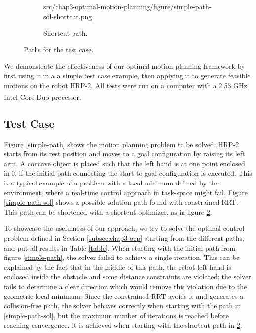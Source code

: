 \begin{figure}
\begin{subfigure}{0.32\columnwidth}
                    {src/chap3-optimal-motion-planning/figure/simple-path-sol-shortcut.png}
    \caption{Shortcut path.}
    \label{simple-path-sol-shortcut}
  \end{subfigure}
  \caption{Paths for the test case.}
\end{figure}

We demonstrate the effectiveness of our optimal motion planning
framework by first using it in a a simple test case example, then
applying it to generate feasible motions on the robot HRP-2. All tests
were run on a computer with a 2.53 GHz
Intel\textsuperscript{\textregistered} Core Duo
processor.

\subsection{Test Case}
\label{test-case}
Figure \ref{simple-path} shows the motion planning problem to be
solved: HRP-2 starts from its rest position and moves to a goal
configuration by raising its left arm. A concave object is placed such
that the left hand is at one point enclosed in it if the initial path
connecting the start to goal configuration is executed. This is a
typical example of a problem with a local minimum defined by the
environment, where a real-time control approach in task-space might
fail. Figure \ref{simple-path-sol} shows a possible solution path
found with constrained RRT. This path can be shortened with a shortcut
optimizer, as in figure \ref{simple-path-sol-shortcut}.

To showcase the usefulness of our approach, we try to solve the
optimal control problem defined in Section \ref{subsec:chap3-ocp}
starting from the different paths, and put all results in Table
\ref{table}. When starting with the initial path from figure
\ref{simple-path}, the solver failed to achieve a single
iteration. This can be explained by the fact that in the middle of
this path, the robot left hand is enclosed inside the obstacle and
some distance constraints are violated; the solver fails to determine
a clear direction which would remove this violation due to the
geometric local minimum. Since the constrained RRT avoids it and
generates a collision-free path, the solver behaves correctly when
starting with the path in \ref{simple-path-sol}, but the maximum
number of iterations is reached before reaching convergence. It is
achieved when starting with the shortcut path in
\ref{simple-path-sol-shortcut}.  

